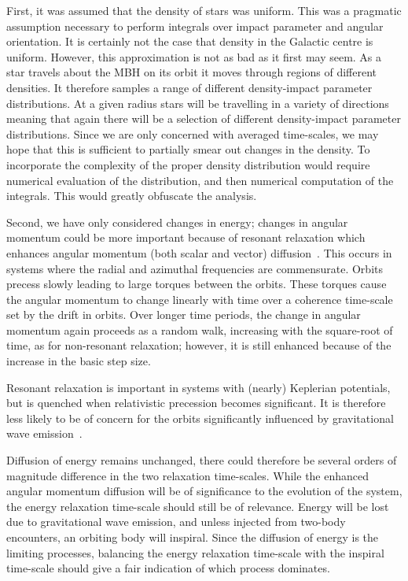 \documentclass[useAMS,usedcolumn,usegraphicx,usenatbib]{mn2e}
\begin{document}
\begin{onecolumn}
First, it was assumed that the density of stars was uniform. This was a pragmatic assumption necessary to perform integrals over impact parameter and angular orientation. It is certainly not the case that density in the Galactic centre is uniform. However, this approximation is not as bad as it first may seem. As a star travels about the MBH on its orbit it moves through regions of different densities. It therefore samples a range of different density-impact parameter distributions. At a given radius stars will be travelling in a variety of directions meaning that again there will be a selection of different density-impact parameter distributions. Since we are only concerned with averaged time-scales, we may hope that this is sufficient to partially smear out changes in the density. To incorporate the complexity of the proper density distribution would require numerical evaluation of the distribution, and then numerical computation of the integrals. This would greatly obfuscate the analysis.

Second, we have only considered changes in energy; changes in angular momentum could be more important because of resonant relaxation which enhances angular momentum (both scalar and vector) diffusion~\citep{Rauch1996,Rauch1998,Gurkan2007,Eilon2009}. This occurs in systems where the radial and azimuthal frequencies are commensurate. Orbits precess slowly leading to large torques between the orbits. These torques cause the angular momentum to change linearly with time over a coherence time-scale set by the drift in orbits. Over longer time periods, the change in angular momentum again proceeds as a random walk, increasing with the square-root of time, as for non-resonant relaxation; however, it is still enhanced because of the increase in the basic step size.

Resonant relaxation is important in systems with (nearly) Keplerian potentials, but is quenched when relativistic precession becomes significant. It is therefore less likely to be of concern for the orbits significantly influenced by gravitational wave emission~\citep{Sigurdsson1997}.

Diffusion of energy remains unchanged, there could therefore be several orders of magnitude difference in the two relaxation time-scales. While the enhanced angular momentum diffusion will be of significance to the evolution of the system, the energy relaxation time-scale should still be of relevance. Energy will be lost due to gravitational wave emission, and unless injected from two-body encounters, an orbiting body will inspiral. Since the diffusion of energy is the limiting processes, balancing the energy relaxation time-scale with the inspiral time-scale should give a fair indication of which process dominates.


\end{onecolumn}
\end{document}
